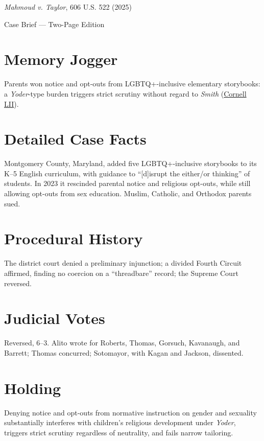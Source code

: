 \documentclass[12pt]{article}
\begin{document}
\begin{center}
{\LARGE \textit{Mahmoud v. Taylor}, 606 U.S. 522 (2025)\par}
\vspace{0.5em}
{\large Case Brief --- Two-Page Edition\par}
\end{center}

\section{Memory Jogger}
Parents won notice and opt-outs from LGBTQ+-inclusive elementary storybooks: a \textit{Yoder}-type burden triggers strict scrutiny without regard to \textit{Smith} (\href{https://www.law.cornell.edu/supremecourt/text/24-297}{Cornell LII}).

\section{Detailed Case Facts}
Montgomery County, Maryland, added five LGBTQ+-inclusive storybooks to its K--5 English curriculum, with guidance to ``[d]isrupt the either/or thinking'' of students. In 2023 it rescinded parental notice and religious opt-outs, while still allowing opt-outs from sex education. Muslim, Catholic, and Orthodox parents sued.

\section{Procedural History}
The district court denied a preliminary injunction; a divided Fourth Circuit affirmed, finding no coercion on a ``threadbare'' record; the Supreme Court reversed.

\section{Judicial Votes}
Reversed, 6--3. Alito wrote for Roberts, Thomas, Gorsuch, Kavanaugh, and Barrett; Thomas concurred; Sotomayor, with Kagan and Jackson, dissented.

\section{Holding}
Denying notice and opt-outs from normative instruction on gender and sexuality substantially interferes with children's religious development under \textit{Yoder}, triggers strict scrutiny regardless of neutrality, and fails narrow tailoring.
\end{document}
